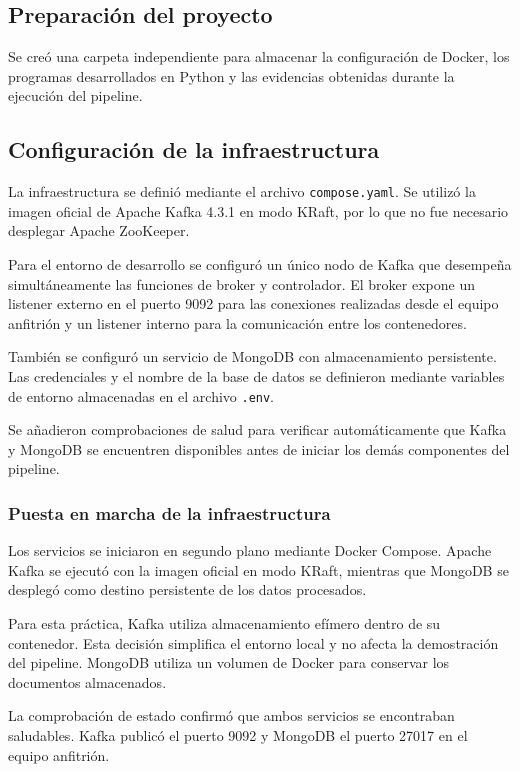 \subsection{Preparación del proyecto}

Se creó una carpeta independiente para almacenar la configuración de Docker,
los programas desarrollados en Python y las evidencias obtenidas durante la
ejecución del pipeline.


\subsection{Configuración de la infraestructura}

La infraestructura se definió mediante el archivo \texttt{compose.yaml}. Se
utilizó la imagen oficial de Apache Kafka 4.3.1 en modo KRaft, por lo que no fue
necesario desplegar Apache ZooKeeper.

Para el entorno de desarrollo se configuró un único nodo de Kafka que desempeña
simultáneamente las funciones de broker y controlador. El broker expone un
listener externo en el puerto 9092 para las conexiones realizadas desde el
equipo anfitrión y un listener interno para la comunicación entre los
contenedores.

También se configuró un servicio de MongoDB con almacenamiento persistente. Las
credenciales y el nombre de la base de datos se definieron mediante variables de
entorno almacenadas en el archivo \texttt{.env}.

Se añadieron comprobaciones de salud para verificar automáticamente que Kafka y
MongoDB se encuentren disponibles antes de iniciar los demás componentes del
pipeline.

\subsubsection{Puesta en marcha de la infraestructura}

Los servicios se iniciaron en segundo plano mediante Docker Compose. Apache
Kafka se ejecutó con la imagen oficial en modo KRaft, mientras que MongoDB se
desplegó como destino persistente de los datos procesados.

Para esta práctica, Kafka utiliza almacenamiento efímero dentro de su
contenedor. Esta decisión simplifica el entorno local y no afecta la
demostración del pipeline. MongoDB utiliza un volumen de Docker para conservar
los documentos almacenados.

La comprobación de estado confirmó que ambos servicios se encontraban
saludables. Kafka publicó el puerto 9092 y MongoDB el puerto 27017 en el equipo
anfitrión.

